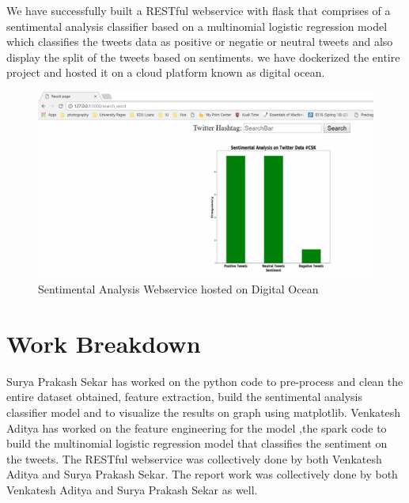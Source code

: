 \begin{enumerate}
We have successfully built a RESTful webservice with flask that comprises of a sentimental analysis 
classifier based on a multinomial logistic regression model which classifies the tweets data as 
positive or negatie or neutral tweets and also display the split of the tweets based on sentiments. 
we have dockerized the entire project and hosted it on a cloud platform known as digital ocean. 

\begin{figure}[!ht]
\centering\includegraphics[width=\columnwidth]{images/result.png}
\caption{Sentimental Analysis Webservice hosted on Digital Ocean}
\label{f:Sentimental Analysis Webservice }
\end{figure}


\section{Work Breakdown}
Surya Prakash Sekar has worked on the python code to pre-process and clean the entire dataset 
obtained, feature extraction, build the sentimental analysis classifier model and to visualize the results on graph using 
matplotlib. Venkatesh Aditya has worked on the feature engineering for the model ,the spark code to 
build the multinomial logistic regression model that classifies the sentiment on the tweets.
The RESTful webservice was collectively done by both Venkatesh Aditya and Surya Prakash Sekar. 
The report work was collectively done by both Venkatesh Aditya and Surya Prakash Sekar as well.


\end{enumerate}
